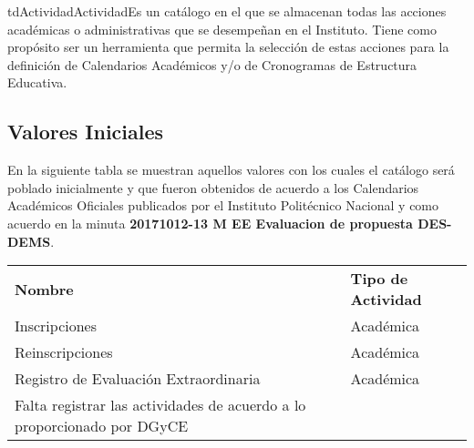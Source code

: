 \begin{TipoDeDato}{tdActividad}{Actividad}{Es un catálogo en el que se almacenan todas las acciones académicas o administrativas que se desempeñan en el Instituto. Tiene como propósito ser un herramienta que permita la selección de estas acciones para la definición de Calendarios Académicos y/o de Cronogramas de Estructura Educativa.}
		\begin{tdAtributos}
			
		\end{tdAtributos}

	\subsection{Valores Iniciales}
	 En la siguiente tabla se muestran aquellos valores con los cuales el catálogo será poblado inicialmente y que fueron obtenidos de acuerdo a los Calendarios Académicos Oficiales publicados por el Instituto Politécnico Nacional y como acuerdo en la minuta \textbf{20171012-13 M EE Evaluacion de propuesta DES-DEMS}.
	 
	 \begin{longtable}{|p{}|p{}|}
	 	\hline
	 	\rowcolor{colorPrincipal}
	 	\multicolumn{2}{|c|}{\bf \color{white} Valores Iniciales}\\
	 	\hline
	 	\rowcolor{colorSecundario}
	 	\bf \color{white}Nombre & \bf \color{white} Tipo de Actividad \\
	 	\hline
	 	Inscripciones & Académica \\
	 	\hline
	 	Reinscripciones & Académica\\
	 	\hline
	 	Registro de Evaluación Extraordinaria & Académica\\
	 	\hline
	 	\TODO  Falta registrar las actividades de acuerdo a lo proporcionado por DGyCE& \\
	 	\hline
	 \end{longtable}

\end{TipoDeDato}

